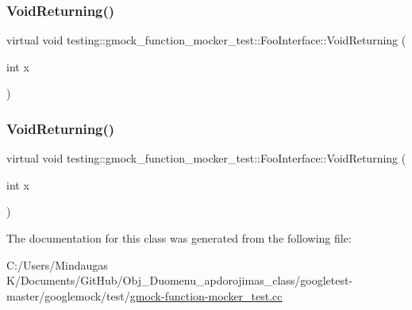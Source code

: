 \subsubsection{\texorpdfstring{VoidReturning()}{VoidReturning()}\hspace{0.1cm}{\footnotesize\ttfamily [1/2]}}
{\footnotesize\ttfamily virtual void testing\+::gmock\+\_\+function\+\_\+mocker\+\_\+test\+::\+Foo\+Interface\+::\+Void\+Returning (\begin{DoxyParamCaption}\item[{int}]{x }\end{DoxyParamCaption})\hspace{0.3cm}{\ttfamily [pure virtual]}}

\mbox{\label{classtesting_1_1gmock__function__mocker__test_1_1_foo_interface_ab62327ee683b362d9e5579266b74a09c}} 
\subsubsection{\texorpdfstring{VoidReturning()}{VoidReturning()}\hspace{0.1cm}{\footnotesize\ttfamily [2/2]}}
{\footnotesize\ttfamily virtual void testing\+::gmock\+\_\+function\+\_\+mocker\+\_\+test\+::\+Foo\+Interface\+::\+Void\+Returning (\begin{DoxyParamCaption}\item[{int}]{x }\end{DoxyParamCaption})\hspace{0.3cm}{\ttfamily [pure virtual]}}



The documentation for this class was generated from the following file\+:\begin{DoxyCompactItemize}
\item 
C\+:/\+Users/\+Mindaugas K/\+Documents/\+Git\+Hub/\+Obj\+\_\+\+Duomenu\+\_\+apdorojimas\+\_\+class/googletest-\/master/googlemock/test/\mbox{\hyperlink{googletest-master_2googlemock_2test_2gmock-function-mocker__test_8cc}{gmock-\/function-\/mocker\+\_\+test.\+cc}}\end{DoxyCompactItemize}
